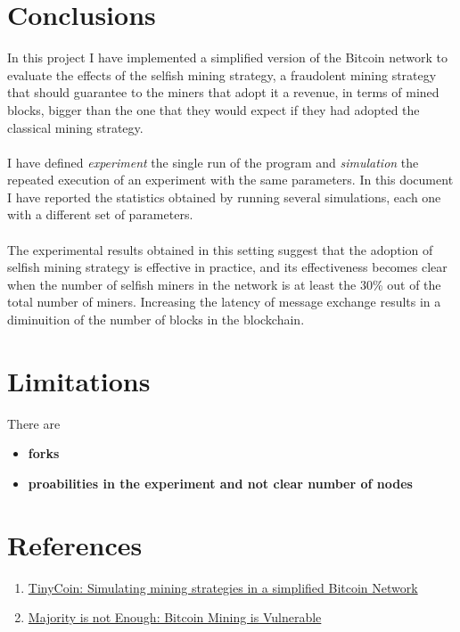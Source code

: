 \documentclass{article}
\begin{document}
\section{Conclusions}
In this project I have implemented a simplified version of the Bitcoin network to evaluate the effects of the selfish mining strategy, a fraudolent mining strategy that should guarantee to the miners that adopt it a revenue, in terms of mined blocks, bigger than the one that they would expect if they had adopted the classical mining strategy. \\ \\
I have defined \textit{experiment} the single run of the program and \textit{simulation} the repeated execution of an experiment with the same parameters. In this document I have reported the statistics obtained by running several simulations, each one with a different set of parameters. \\ \\
The experimental results obtained in this setting suggest that the adoption of selfish mining strategy is effective in practice, and its effectiveness becomes clear when the number of selfish miners in the network is at least the 30\% out of the total number of miners. Increasing the latency of message exchange results in a diminuition of the number of blocks in the blockchain.


\section{Limitations} 
There are 
\begin{itemize}
\item \textbf{forks}
\item \textbf{proabilities in the experiment and not clear number of nodes}
\end{itemize}

\section{References} 
\begin{enumerate}
\item \href{https://elearning.di.unipi.it/pluginfile.php/14179/mod_assign/intro/SelfishMining.pdf}{TinyCoin: Simulating mining strategies in a simplified Bitcoin Network}
\item \href{https://elearning.di.unipi.it/pluginfile.php/14179/mod_assign/intro/MajorityisNotEnough.pdf}{Majority is not Enough: Bitcoin Mining is Vulnerable}
\end{enumerate}
\end{document}
